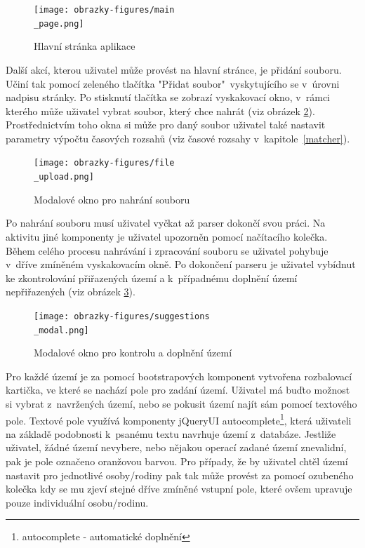 \begin{figure}[H]
	\centering
	\texttt{[image: obrazky-figures/main\\\_page.png]}
	\caption[Hlavní stránka aplikace]{Hlavní stránka aplikace}
	\label{figure_main_page}
\end{figure}

Další akcí, kterou uživatel může provést na hlavní stránce, je přidání souboru. Učiní tak pomocí zeleného tlačítka "Přidat soubor"\ vyskytujícího se v~úrovni nadpisu stránky. Po stisknutí tlačítka se zobrazí vyskakovací okno, v~rámci kterého může uživatel vybrat soubor, který chce nahrát (viz obrázek \ref{figure_file_upload}). Prostřednictvím toho okna si může pro daný soubor uživatel také nastavit parametry výpočtu časových rozsahů (viz časové rozsahy v~kapitole~\ref{matcher}).

\begin{figure}[H]
	\centering
	\texttt{[image: obrazky-figures/file\\\_upload.png]}
	\caption[Modalové okno pro nahrání souboru]{Modalové okno pro nahrání souboru}
	\label{figure_file_upload}
\end{figure}


Po nahrání souboru musí uživatel vyčkat až parser dokončí svou práci. Na aktivitu jiné komponenty je uživatel upozorněn pomocí načítacího kolečka. Během celého procesu nahrávání i zpracování souboru se uživatel pohybuje v~dříve zmíněném vyskakovacím okně. Po dokončení parseru je uživatel vybídnut ke zkontrolování přiřazených území a k~případnému doplnění území nepřiřazených (viz obrázek \ref{figure_suggestion}). 

\begin{figure}[H]
	\centering
	\texttt{[image: obrazky-figures/suggestions\\\_modal.png]}
	\caption[Modalové okno pro kontrolu a doplnění území]{Modalové okno pro kontrolu a doplnění území}
	\label{figure_suggestion}
\end{figure}

Pro každé území je za pomocí bootstrapových komponent vytvořena rozbalovací kartička, ve které se nachází pole pro zadání území. Uživatel má buďto možnost si vybrat z~navržených území, nebo se pokusit území najít sám pomocí textového pole. Textové pole využívá komponenty jQueryUI autocomplete\footnote{autocomplete - automatické doplnění}, která uživateli na základě podobnosti k~psanému textu navrhuje území z~databáze. Jestliže uživatel, žádné území nevybere, nebo nějakou operací zadané území znevalidní, pak je pole označeno oranžovou barvou. Pro případy, že by uživatel chtěl území nastavit pro jednotlivé osoby/rodiny pak tak může provést za pomocí ozubeného kolečka kdy se mu zjeví stejné dříve zmíněné vstupní pole, které ovšem upravuje pouze individuální osobu/rodinu.

